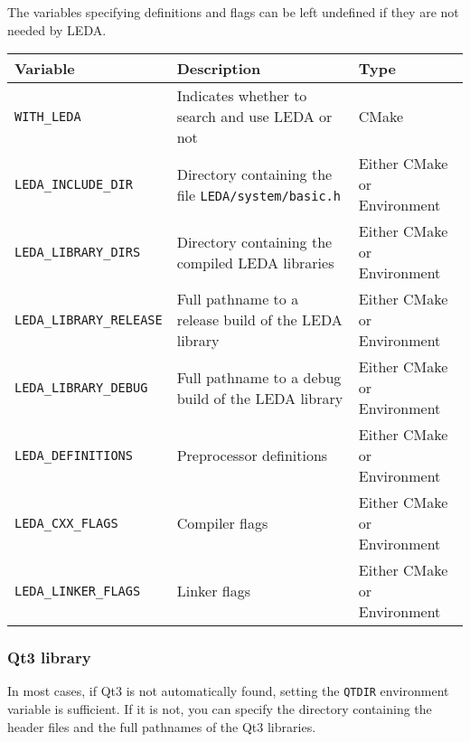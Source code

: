 The variables specifying definitions and flags can be left undefined if they are not needed by LEDA.

{\ccTexHtml{\small}{}
\renewcommand{\arraystretch}{1.3}
\gdef\lcTabularBorder{2}
\begin{tabular}{|l|l|l|} \hline
  \textbf{Variable}               & \textbf{Description}                                       & \textbf{Type}\\\hline\hline
  \texttt{WITH\_LEDA}             & Indicates whether to search and use LEDA or not            & CMake\\\hline
  \texttt{LEDA\_INCLUDE\_DIR}     & Directory containing the file \texttt{LEDA/system/basic.h} & Either CMake or Environment\\\hline
  \texttt{LEDA\_LIBRARY\_DIRS}    & Directory containing the compiled LEDA libraries           & Either CMake or Environment\\\hline
  \texttt{LEDA\_LIBRARY\_RELEASE} & Full pathname to a release build of the LEDA library       & Either CMake or Environment\\\hline
  \texttt{LEDA\_LIBRARY\_DEBUG}   & Full pathname to a debug build of the LEDA library         & Either CMake or Environment\\\hline
  \texttt{LEDA\_DEFINITIONS}      & Preprocessor definitions                                   & Either CMake or Environment\\\hline
  \texttt{LEDA\_CXX\_FLAGS}       & Compiler flags                                             & Either CMake or Environment\\\hline
  \texttt{LEDA\_LINKER\_FLAGS}    & Linker flags                                               & Either CMake or Environment\\\hline
\end{tabular}
}

\subsubsection{Qt3 library}

In most cases, if Qt3 is not automatically found, setting the \texttt{QTDIR} 
environment variable is sufficient. If it is not, you can specify the directory containing 
the header files and the full pathnames of the Qt3 libraries.

